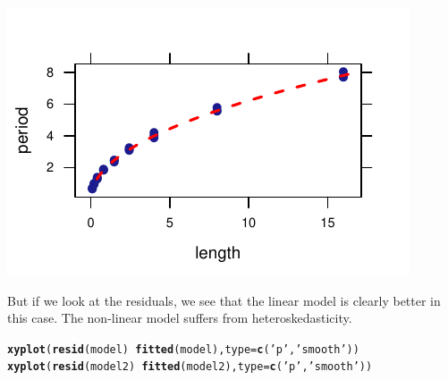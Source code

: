 \documentclass[twoside]{book}\usepackage[]{graphicx}\usepackage[]{xcolor}
\makeatletter
\def\maxwidth{ %
  \ifdim\Gin@nat@width>\linewidth
    \linewidth
  \else
    \Gin@nat@width
  \fi
}
\newcommand{\hlstr}[1]{\textcolor[rgb]{0.192,0.494,0.8}{#1}}%
\newcommand{\hlopt}[1]{\textcolor[rgb]{0,0,0}{#1}}%
\newcommand{\hlstd}[1]{\textcolor[rgb]{0.345,0.345,0.345}{#1}}%
\newcommand{\hlkwc}[1]{\textcolor[rgb]{0.333,0.667,0.333}{#1}}%
\newcommand{\hlkwd}[1]{\textcolor[rgb]{0.737,0.353,0.396}{\textbf{#1}}}%
\newenvironment{kframe}{%
 \def\at@end@of@kframe{}%
 \ifinner\ifhmode%
  \def\at@end@of@kframe{\end{minipage}}%
  \begin{minipage}{\columnwidth}%
 \fi\fi%
 \def\FrameCommand##1{\hskip\@totalleftmargin \hskip-\fboxsep
 \colorbox{shadecolor}{##1}\hskip-\fboxsep
     \hskip-\linewidth \hskip-\@totalleftmargin \hskip\columnwidth}%
 \MakeFramed {\advance\hsize-\width
   \@totalleftmargin\z@ \linewidth\hsize
   \@setminipage}}%
 {\par\unskip\endMakeFramed%
 \at@end@of@kframe}
\newenvironment{knitrout}{}{} %
\makeatother
\begin{document}
\begin{solution}
\begin{knitrout}
{\includegraphics[width=\maxwidth]{figures/fig-unnamed-chunk-210-4} 

}



\end{knitrout}
	But if we look at the residuals, we see that the linear model is clearly 
	better in this case.  The non-linear model suffers from heteroskedasticity.
\begin{knitrout}
\color{fgcolor}\begin{kframe}
\begin{alltt}
\hlkwd{xyplot}\hlstd{(}\hlkwd{resid}\hlstd{(model)} \hlopt{~} \hlkwd{fitted}\hlstd{(model),} \hlkwc{type}\hlstd{=}\hlkwd{c}\hlstd{(}\hlstr{'p'}\hlstd{,}\hlstr{'smooth'}\hlstd{))}
\hlkwd{xyplot}\hlstd{(}\hlkwd{resid}\hlstd{(model2)} \hlopt{~} \hlkwd{fitted}\hlstd{(model2),} \hlkwc{type}\hlstd{=}\hlkwd{c}\hlstd{(}\hlstr{'p'}\hlstd{,}\hlstr{'smooth'}\hlstd{))}
\end{alltt}
\end{kframe}


\end{knitrout}
\end{solution}
\end{document}
